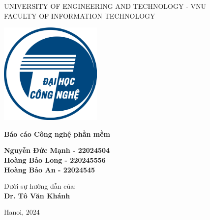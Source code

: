 
\begin{center} \centering
    {UNIVERSITY OF ENGINEERING AND TECHNOLOGY - VNU}\\
    {FACULTY OF INFORMATION TECHNOLOGY}\\
\end{center}


\vspace{15 mm}

\begin{center}
\includegraphics[width = 3\linewidth, height = 5cm, keepaspectratio]{figures/uet.png}
\begin{spacing}{1.5}
\textbf{\large {Báo cáo Công nghệ phần mềm}}\\
\end{spacing}
\vspace{10 mm}

\begin{spacing}{2.0}
\textbf{\LARGE {}}
\end{spacing}

\vspace{15 mm}

\end{center}


\begin{center}
\begin{spacing}{1.5}
\textbf{\Large {Nguyễn Đức Mạnh - 22024504}}\\
\textbf{\Large {Hoàng Bảo Long - 220245556}}\\
\textbf{\Large {Hoàng Bảo An - 22024545}}\\
\end{spacing}
\end{center}

\vspace{5 mm}
\begin{center}
\begin{spacing}{1.3}
{Dưới sự hướng dẫn của:}\\
\textbf{\large {Dr. Tô Văn Khánh}}\\
\end{spacing}
\end{center}

\vspace{15 mm}
\begin{center}
    \large {Hanoi, 2024}
\end{center}
